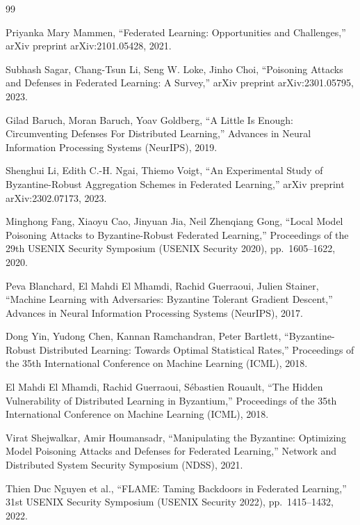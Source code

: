 \documentclass[a4j, dvipdfmx]{jsarticle}
\begin{document}
{\small
\begin{thebibliography}{99}

Priyanka Mary Mammen,
``Federated Learning: Opportunities and Challenges,''
arXiv preprint arXiv:2101.05428, 2021.

Subhash Sagar, Chang-Tsun Li, Seng W. Loke, Jinho Choi,
``Poisoning Attacks and Defenses in Federated Learning: A Survey,''
arXiv preprint arXiv:2301.05795, 2023.

Gilad Baruch, Moran Baruch, Yoav Goldberg,
``A Little Is Enough: Circumventing Defenses For Distributed Learning,''
Advances in Neural Information Processing Systems (NeurIPS), 2019.

Shenghui Li, Edith C.-H. Ngai, Thiemo Voigt,
``An Experimental Study of Byzantine-Robust Aggregation Schemes in Federated Learning,''
arXiv preprint arXiv:2302.07173, 2023.

Minghong Fang, Xiaoyu Cao, Jinyuan Jia, Neil Zhenqiang Gong,
``Local Model Poisoning Attacks to Byzantine-Robust Federated Learning,''
Proceedings of the 29th USENIX Security Symposium (USENIX Security 2020),
pp.~1605--1622, 2020.

Peva Blanchard, El Mahdi El Mhamdi, Rachid Guerraoui, Julien Stainer,
``Machine Learning with Adversaries: Byzantine Tolerant Gradient Descent,''
Advances in Neural Information Processing Systems (NeurIPS), 2017.

Dong Yin, Yudong Chen, Kannan Ramchandran, Peter Bartlett,
``Byzantine-Robust Distributed Learning: Towards Optimal Statistical Rates,''
Proceedings of the 35th International Conference on Machine Learning (ICML), 2018.

El Mahdi El Mhamdi, Rachid Guerraoui, S\'ebastien Rouault,
``The Hidden Vulnerability of Distributed Learning in Byzantium,''
Proceedings of the 35th International Conference on Machine Learning (ICML), 2018.

Virat Shejwalkar, Amir Houmansadr,
``Manipulating the Byzantine: Optimizing Model Poisoning Attacks and Defenses for Federated Learning,''
Network and Distributed System Security Symposium (NDSS), 2021.

Thien Duc Nguyen et al.,
``FLAME: Taming Backdoors in Federated Learning,''
31st USENIX Security Symposium (USENIX Security 2022), pp.~1415--1432, 2022.


\end{thebibliography}}
\end{document}
